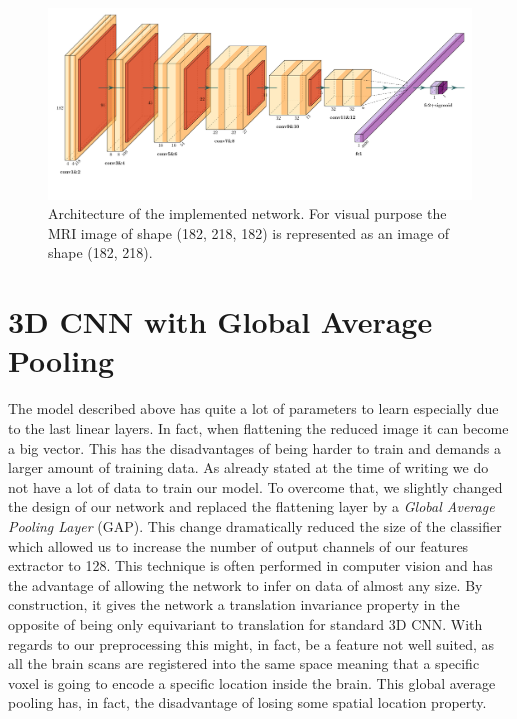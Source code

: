 \begin{figure}
    \centering
    \includegraphics[width=1\linewidth]{figures/models/standard_cnn_model.pdf}
    \caption{Architecture of the implemented network. For visual purpose the MRI image of shape (182, 218, 182) is represented as an image of shape (182, 218).}
    \label{fig:standard_cnn_model}
\end{figure}

\section{3D CNN with Global Average Pooling}

The model described above has quite a lot of parameters to learn especially due to the last linear layers. In fact, when flattening the reduced image it can become a big vector. This has the disadvantages of being harder to train and demands a larger amount of training data. As already stated at the time of writing we do not have a lot of data to train our model. 
To overcome that, we slightly changed the design of our network and replaced the flattening layer by a \textit{Global Average Pooling Layer}\cite{GAP_lin2013network} (GAP). This change dramatically reduced the size of the classifier which allowed us to increase the number of output channels of our features extractor to 128.  
This technique is often performed in computer vision and has the advantage of allowing the network to infer on data of almost any size. By construction, it gives the network a translation invariance property in the opposite of being only equivariant to translation for standard 3D CNN.
With regards to our preprocessing this might, in fact, be a feature not well suited, as all the brain scans are registered into the same space meaning that a specific voxel is going to encode a specific location inside the brain. This global average pooling has, in fact, the disadvantage of losing some spatial location property.


